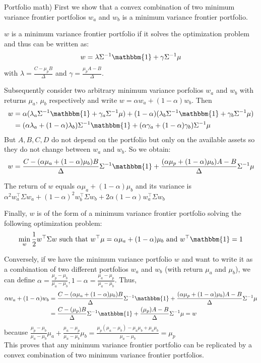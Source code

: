 \documentclass[10pt]{article}
\newenvironment{exercise}[2][Exercise]{\begin{trivlist}
  \item[\hskip \labelsep {\bfseries #1}\hskip \labelsep {\bfseries #2.}]}{\end{trivlist}}
\begin{document}
\begin{exercise}{2}(Portfolio math)
   First we show that a convex combination of two minimum variance frontier portfolios $w_a$ and $w_b$ is a minimum variance frontier portfolio.

   $w$ is a minimum variance frontier portfolio if it solves the optimization problem and thus can be written as: 
   $$ w = \lambda\Sigma^{-1}\mathbbm{1}+ \gamma\Sigma^{-1}\mu$$ with $\lambda = \frac{C- \mu_pB}{\Delta}$ and $\gamma = \frac{\mu_pA-B}{\Delta}$. 

   Subsequently consider two arbitrary minimum variance porfolios $w_a$ and $w_b$ with returns $\mu_a$, $\mu_b$ respectively and write $w = \alpha w_a + (1-\alpha)w_b$. 
   Then \begin{align*}
    w &= \alpha (\lambda_a\Sigma^{-1}\mathbbm{1} + \gamma_a\Sigma^{-1}\mu) + (1-\alpha)(\lambda_b\Sigma^{-1}\mathbbm{1} + \gamma_b\Sigma^{-1}\mu) \\
    &= (\alpha \lambda_a + (1-\alpha) \lambda_b)\Sigma^{-1}\mathbbm{1} + (\alpha \gamma_a + (1-\alpha) \gamma_b)\Sigma^{-1}\mu
   \end{align*} 
   But $A,B,C,D$ do not depend on the portfolio but only on the available assets so they do not change between $w_a$ and $w_b$. So we obtain:
   $$ w = \frac{C- (\alpha\mu_a+(1-\alpha)\mu_b)B}{\Delta}\Sigma^{-1}\mathbbm{1} + \frac{(\alpha\mu_p + (1-\alpha)\mu_b)A-B}{\Delta}\Sigma^{-1}\mu$$

  The return of $w$ equals $\alpha\mu_a+(1-\alpha)\mu_b$ and its variance is $\alpha^2 w_a^\top\Sigma w_a + (1-\alpha)^2 w_b^\top\Sigma w_b + 2\alpha(1-\alpha)w_a^\top\Sigma w_b$

  Finally, $w$ is of the form of a minimum variance frontier portfolio solving the following optimization problem: 
  $$ \min_{w} \frac{1}{2} w^\top\Sigma w \text{ such that } w^\top\mu = \alpha\mu_a+(1-\alpha)\mu_b \text{ and } w^\top\mathbbm{1} = 1$$
  
  Conversely, if we have the minimum variance portfolio $w$ and want to write it as a combination of two different portfolios $w_a$ and $w_b$ (with return $\mu_a$ and $\mu_b$), we can define $\alpha = \frac{\mu_p-\mu_b}{\mu_a-\mu_b}, 1- \alpha = \frac{\mu_a - \mu_p}{\mu_a - \mu_b}$. 
  Thus, \begin{align*}
    \alpha w_a + (1-\alpha)w_b &= \frac{C- (\alpha\mu_a+(1-\alpha)\mu_b)B}{\Delta}\Sigma^{-1}\mathbbm{1} + \frac{(\alpha\mu_p + (1-\alpha)\mu_b)A-B}{\Delta}\Sigma^{-1}\mu \\
    &= \frac{C- (\mu_p)B}{\Delta}\Sigma^{-1}\mathbbm{1} + \frac{(\mu_p)A-B}{\Delta}\Sigma^{-1}\mu = w
  \end{align*} because $ \frac{\mu_p-\mu_b}{\mu_a-\mu_b}\mu_a + \frac{\mu_a - \mu_p}{\mu_a - \mu_b}\mu_b = \frac{\mu_p(\mu_a-\mu_b)-\mu_a\mu_b + \mu_a\mu_b}{\mu_a-\mu_b} = \mu_p$
\\
  This proves that any minimum variance frontier portfolio can be replicated by a convex combination of two minimum variance frontier portfolios. 


\end{exercise}
\end{document}
